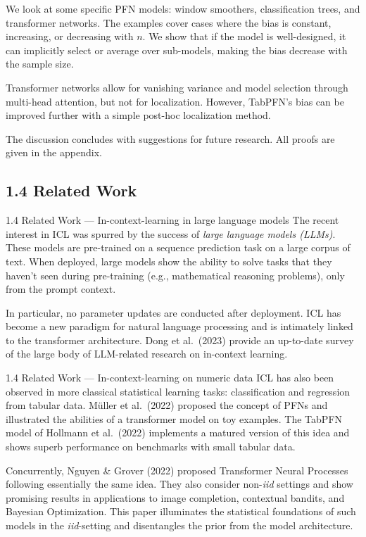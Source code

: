 \documentclass[aspectratio=169,10pt]{beamer}
\newcommand{\currentheading}{\ifx\insertsubsection\empty\insertsection\else\insertsubsection\fi}
\begin{document}
\begin{frame}{\currentheading}
We look at some specific PFN models: window smoothers, classification trees, and transformer networks. The examples cover cases where the bias is constant, increasing, or decreasing with $n$. We show that if the model is well-designed, it can implicitly select or average over sub-models, making the bias decrease with the sample size.

Transformer networks allow for vanishing variance and model selection through multi-head attention, but not for localization. However, TabPFN's bias can be improved further with a simple post-hoc localization method.
\end{frame}

\begin{frame}{\currentheading}
The discussion concludes with suggestions for future research. All proofs are given in the appendix.
\end{frame}

\subsection{1.4 Related Work}

\begin{frame}{1.4 Related Work --- In-context-learning in large language models}
The recent interest in ICL was spurred by the success of \emph{large language models (LLMs)}. These models are pre-trained on a sequence prediction task on a large corpus of text. When deployed, large models show the ability to solve tasks that they haven't seen during pre-training (e.g., mathematical reasoning problems), only from the prompt context.

In particular, no parameter updates are conducted after deployment. ICL has become a new paradigm for natural language processing and is intimately linked to the transformer architecture. Dong et al.\ (2023) provide an up-to-date survey of the large body of LLM-related research on in-context learning.
\end{frame}

\begin{frame}{1.4 Related Work --- In-context-learning on numeric data}
ICL has also been observed in more classical statistical learning tasks: classification and regression from tabular data. Müller et al.\ (2022) proposed the concept of PFNs and illustrated the abilities of a transformer model on toy examples. The TabPFN model of Hollmann et al.\ (2022) implements a matured version of this idea and shows superb performance on benchmarks with small tabular data.

Concurrently, Nguyen \& Grover (2022) proposed Transformer Neural Processes following essentially the same idea. They also consider non-\emph{iid} settings and show promising results in applications to image completion, contextual bandits, and Bayesian Optimization. This paper illuminates the statistical foundations of such models in the \emph{iid}-setting and disentangles the prior from the model architecture.
\end{frame}
\end{document}
